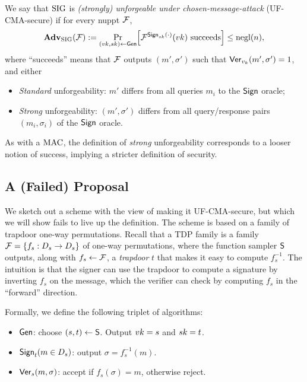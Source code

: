 \documentclass[11pt]{article}
\begin{document}
\begin{definition}
  \label{def:uf-cma-sig}
  We say that $\text{SIG}$ is \emph{(strongly) unforgeable under
    chosen-message-attack} (UF-CMA-secure) if for every nuppt $\mathcal{F}$,
  \[ \advan_{\sig}(\For) := \Pr_{(\vk,\sk) \gets \siggen}
  \bracks*{\For^{\sigsign_{\sk}(\cdot)}(\vk) \text{ succeeds}} \leq
  \negl(n), \] where ``succeeds'' means that $\mathcal{F}$ outputs $(m' ,
  \sigma')$ such that $\mathsf{Ver}_{v_{k}}(m' , \sigma') = 1$, and either
  \begin{itemize}
  \item \emph{Standard} unforgeability: $m'$ differs from all queries
    $m_{i}$ to the $\mathsf{Sign}$ oracle;
  \item \emph{Strong} unforgeability: $(m', \sigma')$ differs from all
    query/response pairs $(m_{i}, \sigma_{i})$ of the $\mathsf{Sign}$
    oracle.
  \end{itemize}
\end{definition}

As with a $\text{MAC}$, the definition of \emph{strong} unforgeability
corresponds to a looser notion of success, implying a stricter
definition of security.

\subsection{A (Failed) Proposal}
\label{sec:failed-proposal}

We sketch out a scheme with the view of making it UF-CMA-secure, but
which we will show fails to live up the definition.  The scheme is
based on a family of trapdoor one-way permutations.  Recall that a TDP
family is a family $\mathcal{F} = \{f_{s} : D_{s} \to D_{s}\}$ of one-way
permutations, where the function sampler $\mathsf{S}$ outputs, along
with $f_{s} \gets \mathcal{F}$, a \emph{trapdoor} $t$ that makes it easy to
compute $f_{s}^{-1}$.  The intuition is that the signer can use the
trapdoor to compute a signature by inverting $f_{s}$ on the message,
which the verifier can check by computing $f_{s}$ in the ``forward''
direction.

Formally, we define the following triplet of algorithms:
\begin{itemize}
\item $\mathsf{Gen}$: choose $(s,t) \gets \mathsf{S}$.  Output $vk = s$ and
  $sk = t$. 
\item $\mathsf{Sign}_{t} (m \in D_{s})$: output $\sigma = f_{s}^{-1}(m)$.
\item $\mathsf{Ver}_{s}(m , \sigma)$: accept if $f_{s}(\sigma) = m$,
  otherwise reject.
\end{itemize}
\end{document}
